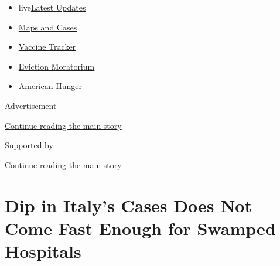 \begin{itemize}
\tightlist
\item
  live\href{https://www.nytimes3xbfgragh.onion/2020/09/05/world/coronavirus-covid.html?name=styln-coronavirus-national\&region=TOP_BANNER\&block=storyline_menu_recirc\&action=click\&pgtype=Article\&impression_id=6fe7a8f1-efba-11ea-b9e2-fd85e1bd9bd3\&variant=undefined}{Latest
  Updates}
\item
  \href{https://www.nytimes3xbfgragh.onion/interactive/2020/us/coronavirus-us-cases.html?name=styln-coronavirus-national\&region=TOP_BANNER\&block=storyline_menu_recirc\&action=click\&pgtype=Article\&impression_id=6fe7a8f2-efba-11ea-b9e2-fd85e1bd9bd3\&variant=undefined}{Maps
  and Cases}
\item
  \href{https://www.nytimes3xbfgragh.onion/interactive/2020/science/coronavirus-vaccine-tracker.html?name=styln-coronavirus-national\&region=TOP_BANNER\&block=storyline_menu_recirc\&action=click\&pgtype=Article\&impression_id=6fe7a8f3-efba-11ea-b9e2-fd85e1bd9bd3\&variant=undefined}{Vaccine
  Tracker}
\item
  \href{https://www.nytimes3xbfgragh.onion/2020/09/02/your-money/eviction-moratorium-covid.html?name=styln-coronavirus-national\&region=TOP_BANNER\&block=storyline_menu_recirc\&action=click\&pgtype=Article\&impression_id=6fe7a8f4-efba-11ea-b9e2-fd85e1bd9bd3\&variant=undefined}{Eviction
  Moratorium}
\item
  \href{https://www.nytimes3xbfgragh.onion/interactive/2020/09/02/magazine/food-insecurity-hunger-us.html?name=styln-coronavirus-national\&region=TOP_BANNER\&block=storyline_menu_recirc\&action=click\&pgtype=Article\&impression_id=6fe7a8f5-efba-11ea-b9e2-fd85e1bd9bd3\&variant=undefined}{American
  Hunger}
\end{itemize}

Advertisement

\protect\hyperlink{after-top}{Continue reading the main story}

Supported by

\protect\hyperlink{after-sponsor}{Continue reading the main story}

\hypertarget{dip-in-italys-cases-does-not-come-fast-enough-for-swamped-hospitals}{%
\section{Dip in Italy's Cases Does Not Come Fast Enough for Swamped
Hospitals}\label{dip-in-italys-cases-does-not-come-fast-enough-for-swamped-hospitals}}

